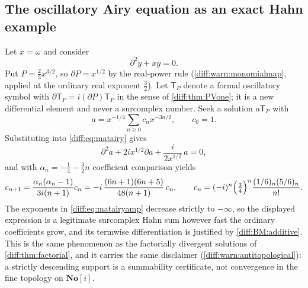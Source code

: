 \documentclass[11pt,letterpaper]{article}
\numberwithin{equation}{section}
\theoremstyle{definition}
\theoremstyle{remark}
\newcommand{\SC}{\mathbf{No}[i]}
\newcommand{\der}{\partial}
\begin{document}
\subsection{The oscillatory Airy equation as an exact Hahn example}
\label{diff:sub:matairy}

Let $x=\omega$ and consider
\begin{equation}\label{diff:eq:matairy}
 \der^{2}y+xy=0 .
\end{equation}
Put $P=\tfrac23x^{3/2}$, so $\der P=x^{1/2}$ by the real-power rule
(\cref{diff:warn:monomialmap}, applied at the ordinary real exponent
$\tfrac32$). Let $\mathsf T_{P}$ denote a formal oscillatory symbol with
$\der\mathsf T_{P}=i(\der P)\mathsf T_{P}$ in the sense of
\cref{diff:thm:PVone}; it is a new differential element and never a surcomplex
number. Seek a solution $a\mathsf T_{P}$ with
\begin{equation}\label{diff:eq:matairyamp}
 a=x^{-1/4}\sum_{n\geq0}c_{n}x^{-3n/2},\qquad c_{0}=1 .
\end{equation}
Substituting into \cref{diff:eq:matairy} gives
\begin{equation}\label{diff:eq:matairyampeq}
 \der^{2}a+2ix^{1/2}\der a+\frac{i}{2x^{1/2}}\,a=0 ,
\end{equation}
and with $\alpha_{n}=-\tfrac14-\tfrac32n$ coefficient comparison yields
\begin{equation}\label{diff:eq:matairyrec}
 c_{n+1}=\frac{\alpha_{n}(\alpha_{n}-1)}{3i(n+1)}c_{n}
        =-i\,\frac{(6n+1)(6n+5)}{48(n+1)}\,c_{n},
 \qquad
 c_{n}=(-i)^{n}\Bigl(\tfrac34\Bigr)^{n}
       \frac{(1/6)_{n}(5/6)_{n}}{n!} .
\end{equation}
The exponents in \cref{diff:eq:matairyamp} decrease strictly to $-\infty$, so
the displayed expression is a legitimate surcomplex Hahn sum however fast the
ordinary coefficients grow, and its termwise differentiation is justified by
\ref{diff:BM:additive}. This is the same phenomenon as the factorially
divergent solutions of \cref{diff:thm:factorial}, and it carries the same
disclaimer (\cref{diff:warn:antitopological}): a strictly descending support is
a summability certificate, not convergence in the fine topology on $\SC$.
\end{document}
